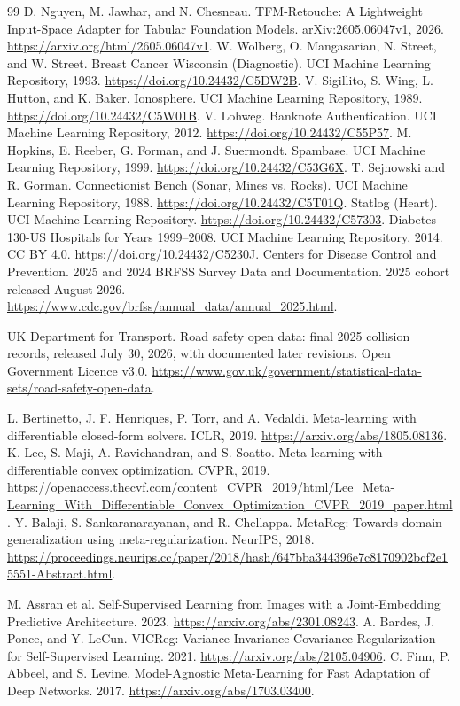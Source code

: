\documentclass[10pt]{article}
\begin{document}
\begin{thebibliography}{99}
D. Nguyen, M. Jawhar, and N. Chesneau.
TFM-Retouche: A Lightweight Input-Space Adapter for Tabular Foundation Models.
arXiv:2605.06047v1, 2026.
\url{https://arxiv.org/html/2605.06047v1}.
W. Wolberg, O. Mangasarian, N. Street, and W. Street.
Breast Cancer Wisconsin (Diagnostic). UCI Machine Learning Repository, 1993.
\url{https://doi.org/10.24432/C5DW2B}.
V. Sigillito, S. Wing, L. Hutton, and K. Baker.
Ionosphere. UCI Machine Learning Repository, 1989.
\url{https://doi.org/10.24432/C5W01B}.
V. Lohweg. Banknote Authentication. UCI Machine Learning Repository, 2012.
\url{https://doi.org/10.24432/C55P57}.
M. Hopkins, E. Reeber, G. Forman, and J. Suermondt.
Spambase. UCI Machine Learning Repository, 1999.
\url{https://doi.org/10.24432/C53G6X}.
T. Sejnowski and R. Gorman.
Connectionist Bench (Sonar, Mines vs. Rocks). UCI Machine Learning Repository, 1988.
\url{https://doi.org/10.24432/C5T01Q}.
Statlog (Heart). UCI Machine Learning Repository.
\url{https://doi.org/10.24432/C57303}.
Diabetes 130-US Hospitals for Years 1999--2008.
UCI Machine Learning Repository, 2014. CC BY 4.0.
\url{https://doi.org/10.24432/C5230J}.
Centers for Disease Control and Prevention. 2025 and 2024 BRFSS Survey Data and Documentation. 2025 cohort released August 2026. \url{https://www.cdc.gov/brfss/annual_data/annual_2025.html}.

UK Department for Transport. Road safety open data: final 2025 collision records, released July 30, 2026, with documented later revisions. Open Government Licence v3.0. \url{https://www.gov.uk/government/statistical-data-sets/road-safety-open-data}.

L. Bertinetto, J. F. Henriques, P. Torr, and A. Vedaldi.
Meta-learning with differentiable closed-form solvers. ICLR, 2019.
\url{https://arxiv.org/abs/1805.08136}.
K. Lee, S. Maji, A. Ravichandran, and S. Soatto.
Meta-learning with differentiable convex optimization. CVPR, 2019.
\url{https://openaccess.thecvf.com/content_CVPR_2019/html/Lee_Meta-Learning_With_Differentiable_Convex_Optimization_CVPR_2019_paper.html}.
Y. Balaji, S. Sankaranarayanan, and R. Chellappa.
MetaReg: Towards domain generalization using meta-regularization. NeurIPS, 2018.
\url{https://proceedings.neurips.cc/paper/2018/hash/647bba344396e7c8170902bcf2e15551-Abstract.html}.

M. Assran et al. Self-Supervised Learning from Images with a Joint-Embedding Predictive Architecture. 2023.
\url{https://arxiv.org/abs/2301.08243}.
A. Bardes, J. Ponce, and Y. LeCun. VICReg: Variance-Invariance-Covariance Regularization for Self-Supervised Learning. 2021.
\url{https://arxiv.org/abs/2105.04906}.
C. Finn, P. Abbeel, and S. Levine. Model-Agnostic Meta-Learning for Fast Adaptation of Deep Networks. 2017.
\url{https://arxiv.org/abs/1703.03400}.


\end{thebibliography}
\end{document}

